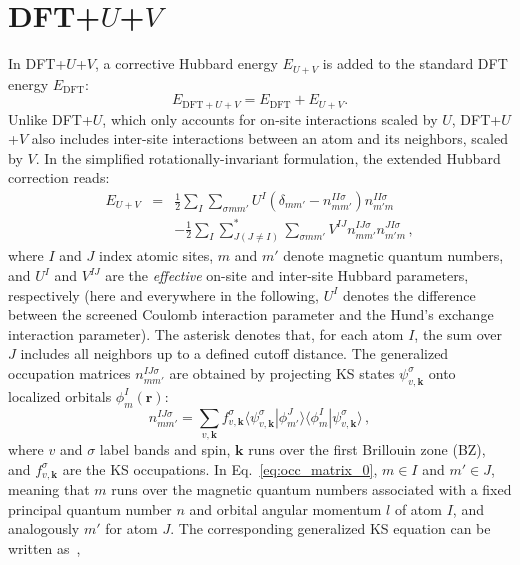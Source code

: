\documentclass[11pt]{article}
\newcommand{\braket}[2] { \langle #1 | #2 \rangle }
\begin{document}
\newpage
\clearpage

\section{DFT+$U$+$V$}

In DFT+$U$+$V$, a corrective Hubbard energy $E_{U+V}$ is added to the standard DFT energy $E_{\mathrm{DFT}}$:
%
\begin{equation}
    E_{\mathrm{DFT}+U+V} = E_{\mathrm{DFT}} + E_{U+V} .
    \label{eq:Edft_plus_uv}
\end{equation}
%
Unlike DFT+$U$, which only accounts for on-site interactions scaled by $U$, DFT+$U$+$V$ also includes inter-site interactions between an atom and its neighbors, scaled by $V$. In the simplified rotationally-invariant formulation, the extended Hubbard correction reads:
%
\begin{eqnarray}
    E_{U+V} & = & \frac{1}{2} \sum_I \sum_{\sigma m m'}
    U^I \left( \delta_{m m'} - n^{II \sigma}_{m m'} \right) n^{II \sigma}_{m' m} \nonumber \\
    & & - \frac{1}{2} \sum_{I} \sum_{J (J \ne I)}^{*} \sum_{\sigma m m'} V^{I J}
    n^{I J \sigma}_{m m'} n^{J I \sigma}_{m' m} \,,
    \label{eq:Edftu}
\end{eqnarray}
%
where $I$ and $J$ index atomic sites, $m$ and $m'$ denote magnetic quantum numbers, and $U^I$ and $V^{IJ}$ are the \textit{effective} on-site and inter-site Hubbard parameters, respectively (here and everywhere in the following, $U^I$ denotes the difference between the screened Coulomb interaction parameter and the Hund's exchange interaction parameter). The asterisk denotes that, for each atom $I$, the sum over $J$ includes all neighbors up to a defined cutoff distance. The generalized occupation matrices $n^{IJ \sigma}_{m m'}$ are obtained by projecting KS states $\psi^\sigma_{v,\mathbf{k}}$ onto localized orbitals $\phi^I_m(\mathbf{r})$:
%
\begin{equation}
    n^{I J \sigma}_{m m'} = \sum_{v,\mathbf{k}} f^\sigma_{v,\mathbf{k}}
    \braket{\psi^\sigma_{v,\mathbf{k}}}{\phi^{J}_{m'}} \braket{\phi^{I}_{m}}{\psi^\sigma_{v,\mathbf{k}}} \,,
    \label{eq:occ_matrix_0}
\end{equation}
%
where $v$ and $\sigma$ label bands and spin, $\mathbf{k}$ runs over the first Brillouin zone (BZ), and $f^\sigma_{v,\mathbf{k}}$ are the KS occupations. In Eq.~\eqref{eq:occ_matrix_0}, $m \in I$ and $m' \in J$, meaning that $m$ runs over the magnetic quantum numbers associated with a fixed principal quantum number $n$ and orbital angular momentum $l$ of atom $I$, and analogously $m'$ for atom $J$. The corresponding generalized KS equation can be written as~\cite{Campo:2010},
\end{document}
